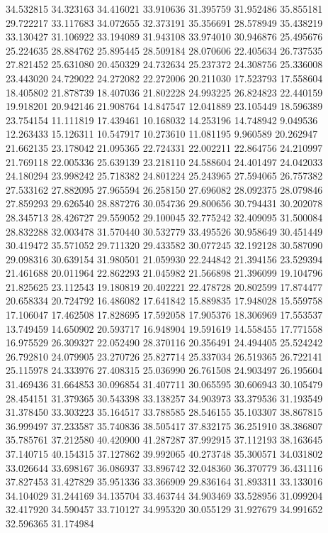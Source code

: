 34.532815
34.323163
34.416021
33.910636
31.395759
31.952486
35.855181
29.722217
33.117683
34.072655
32.373191
35.356691
28.578949
35.438219
33.130427
31.106922
33.194089
31.943108
33.974010
30.946876
25.495676
25.224635
28.884762
25.895445
28.509184
28.070606
22.405634
26.737535
27.821452
25.631080
20.450329
24.732634
25.237372
24.308756
25.336008
23.443020
24.729022
24.272082
22.272006
20.211030
17.523793
17.558604
18.405802
21.878739
18.407036
21.802228
24.993225
26.824823
22.440159
19.918201
20.942146
21.908764
14.847547
12.041889
23.105449
18.596389
23.754154
11.111819
17.439461
10.168032
14.253196
14.748942
9.049536
12.263433
15.126311
10.547917
10.273610
11.081195
9.960589
20.262947
21.662135
23.178042
21.095365
22.724331
22.002211
22.864756
24.210997
21.769118
22.005336
25.639139
23.218110
24.588604
24.401497
24.042033
24.180294
23.998242
25.718382
24.801224
25.243965
27.594065
26.757382
27.533162
27.882095
27.965594
26.258150
27.696082
28.092375
28.079846
27.859293
29.626540
28.887276
30.054736
29.800656
30.794431
30.202078
28.345713
28.426727
29.559052
29.100045
32.775242
32.409095
31.500084
28.832288
32.003478
31.570440
30.532779
33.495526
30.958649
30.451449
30.419472
35.571052
29.711320
29.433582
30.077245
32.192128
30.587090
29.098316
30.639154
31.980501
21.059930
22.244842
21.394156
23.529394
21.461688
20.011964
22.862293
21.045982
21.566898
21.396099
19.104796
21.825625
23.112543
19.180819
20.402221
22.478728
20.802599
17.874477
20.658334
20.724792
16.486082
17.641842
15.889835
17.948028
15.559758
17.106047
17.462508
17.828695
17.592058
17.905376
18.306969
17.553537
13.749459
14.650902
20.593717
16.948904
19.591619
14.558455
17.771558
16.975529
26.309327
22.052490
28.370116
20.356491
24.494405
25.524242
26.792810
24.079905
23.270726
25.827714
25.337034
26.519365
26.722141
25.115978
24.333976
27.408315
25.036990
26.761508
24.903497
26.195604
31.469436
31.664853
30.096854
31.407711
30.065595
30.606943
30.105479
28.454151
31.379365
30.543398
33.138257
34.903973
33.379536
31.193549
31.378450
33.303223
35.164517
33.788585
28.546155
35.103307
38.867815
36.999497
37.233587
35.740836
38.505417
37.832175
36.251910
38.386807
35.785761
37.212580
40.420900
41.287287
37.992915
37.112193
38.163645
37.140715
40.154315
37.127862
39.992065
40.273748
35.300571
34.031802
33.026644
33.698167
36.086937
33.896742
32.048360
36.370779
36.431116
37.827453
31.427829
35.951336
33.366909
29.836164
31.893311
33.133016
34.104029
31.244169
34.135704
33.463744
34.903469
33.528956
31.099204
32.417920
34.590457
33.710127
34.995320
30.055129
31.927679
34.991652
32.596365
31.174984
